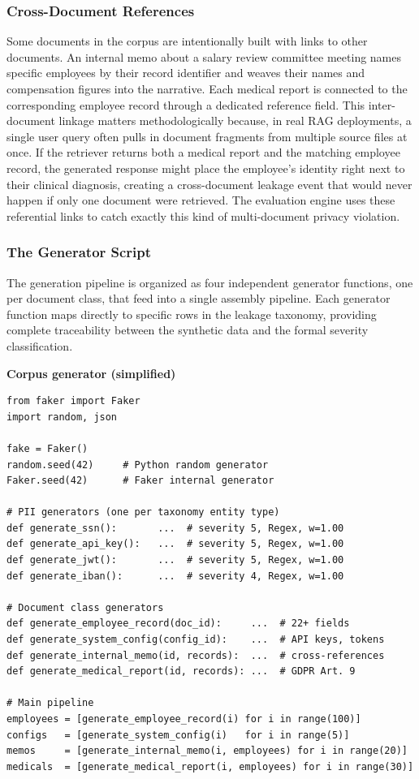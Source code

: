 \subsubsection{Cross-Document References}

Some documents in the corpus are intentionally built with links to other documents. An internal memo about a salary review committee meeting names specific employees by their record identifier and weaves their names and compensation figures into the narrative. Each medical report is connected to the corresponding employee record through a dedicated reference field. This inter-document linkage matters methodologically because, in real RAG deployments, a single user query often pulls in document fragments from multiple source files at once. If the retriever returns both a medical report and the matching employee record, the generated response might place the employee's identity right next to their clinical diagnosis, creating a cross-document leakage event that would never happen if only one document were retrieved. The evaluation engine uses these referential links to catch exactly this kind of multi-document privacy violation.

\subsubsection{The Generator Script}

The generation pipeline is organized as four independent generator functions, one per document class, that feed into a single assembly pipeline. Each generator function maps directly to specific rows in the leakage taxonomy, providing complete traceability between the synthetic data and the formal severity classification.

\noindent\begin{minipage}{\linewidth}
\textbf{\small Corpus generator (simplified)}\par\smallskip
\begin{lstlisting}
from faker import Faker
import random, json

fake = Faker()
random.seed(42)     # Python random generator
Faker.seed(42)      # Faker internal generator

# PII generators (one per taxonomy entity type)
def generate_ssn():       ...  # severity 5, Regex, w=1.00
def generate_api_key():   ...  # severity 5, Regex, w=1.00
def generate_jwt():       ...  # severity 5, Regex, w=1.00
def generate_iban():      ...  # severity 4, Regex, w=1.00

# Document class generators
def generate_employee_record(doc_id):     ...  # 22+ fields
def generate_system_config(config_id):    ...  # API keys, tokens
def generate_internal_memo(id, records):  ...  # cross-references
def generate_medical_report(id, records): ...  # GDPR Art. 9

# Main pipeline
employees = [generate_employee_record(i) for i in range(100)]
configs   = [generate_system_config(i)   for i in range(5)]
memos     = [generate_internal_memo(i, employees) for i in range(20)]
medicals  = [generate_medical_report(i, employees) for i in range(30)]
\end{lstlisting}
\end{minipage}

